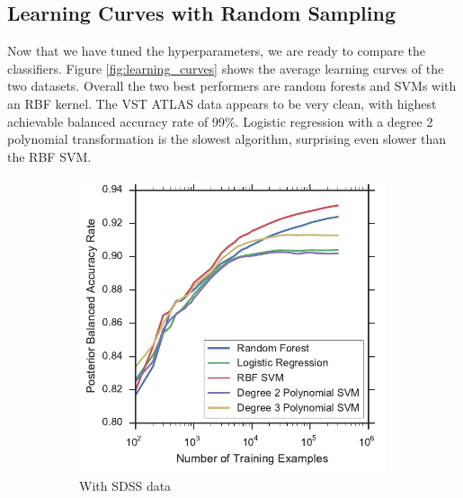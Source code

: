 \subsection{Learning Curves with Random Sampling}
\label{sub:lc}

Now that we have tuned the hyperparameters, we are ready to compare the classifiers.
Figure \ref{fig:learning_curves} shows the average learning curves of the two datasets.
Overall the two best performers are random forests and SVMs with an RBF kernel. The VST ATLAS
data appears to be very clean, with highest achievable balanced accuracy rate of 99\%.
Logistic regression with a degree 2 polynomial transformation is the slowest algorithm,
surprising even slower than the RBF SVM.

\begin{figure}[tbp]
	\centering
	\begin{subfigure}{.5\textwidth}
		\centering
		\includegraphics[width=0.99\textwidth]{figures/4_expt1/sdss_learning_curves}
		\caption{With SDSS data}
		\label{fig:sdss_learning_curves}
	\end{subfigure}%
	\begin{subfigure}{.5\textwidth}
		\centering

\end{subfigure}
\end{figure}
